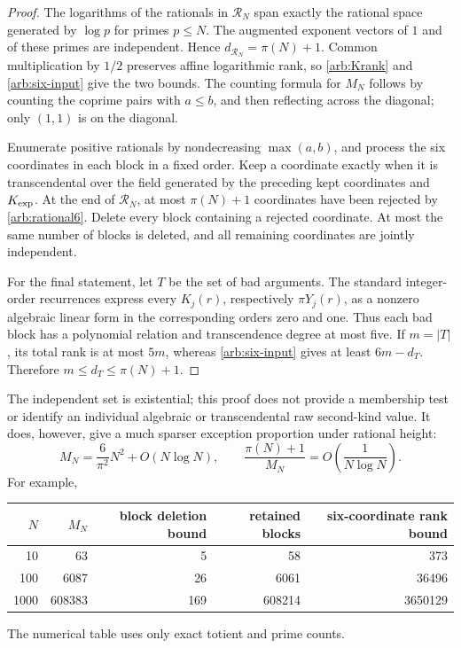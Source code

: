 \documentclass[11pt,a4paper]{article}
\theoremstyle{definition}
\theoremstyle{remark}
\numberwithin{equation}{section}
\begin{document}
\begin{proof}
The logarithms of the rationals in \(\mathcal R_N\) span exactly
the rational space generated by \(\log p\) for primes \(p\leq N\).
The augmented exponent vectors of \(1\) and of these primes are
independent.  Hence \(d_{\mathcal R_N}=\pi(N)+1\).
Common multiplication by \(1/2\) preserves affine logarithmic
rank, so \eqref{arb:Krank} and \eqref{arb:six-input} give the two
bounds.  The counting formula for \(M_N\) follows by counting the
coprime pairs with \(a\leq b\), and then reflecting across the
diagonal; only \((1,1)\) is on the diagonal.

Enumerate positive rationals by nondecreasing \(\max(a,b)\), and
process the six coordinates in each block in a fixed order.  Keep a
coordinate exactly when it is transcendental over the field generated
by the preceding kept coordinates and \(K_{\mathrm{exp}}\).
At the end of \(\mathcal R_N\), at most \(\pi(N)+1\) coordinates
have been rejected by \eqref{arb:rational6}.  Delete every block
containing a rejected coordinate.  At most the same number of blocks
is deleted, and all remaining coordinates are jointly independent.

For the final statement, let \(T\) be the set of bad arguments.
The standard integer-order recurrences express every
\(K_j(r)\), respectively \(\pi Y_j(r)\), as a nonzero
algebraic linear form in the corresponding orders zero and one.
Thus each bad block has a polynomial relation and transcendence
degree at most five.  If \(m=|T|\), its total rank is at most
\(5m\), whereas \eqref{arb:six-input} gives at least
\(6m-d_T\).  Therefore \(m\leq d_T\leq\pi(N)+1\).
\end{proof}

The independent set is existential; this proof does not provide a
membership test or identify an individual algebraic or transcendental
raw second-kind value.  It does, however, give a much sparser
exception proportion under rational height:
\[
 M_N=\frac{6}{\pi^2}N^2+O(N\log N),\qquad
 \frac{\pi(N)+1}{M_N}=O\!\left(\frac1{N\log N}\right).
\]
For example,
\begin{center}
\begin{tabular}{rrrrr}
\toprule
\(N\)&\(M_N\)&block deletion bound&retained blocks&six-coordinate rank bound\\
\midrule
10&63&5&58&373\\
100&6087&26&6061&36496\\
1000&608383&169&608214&3650129\\
\bottomrule
\end{tabular}
\end{center}
The numerical table uses only exact totient and prime counts.
\end{document}
